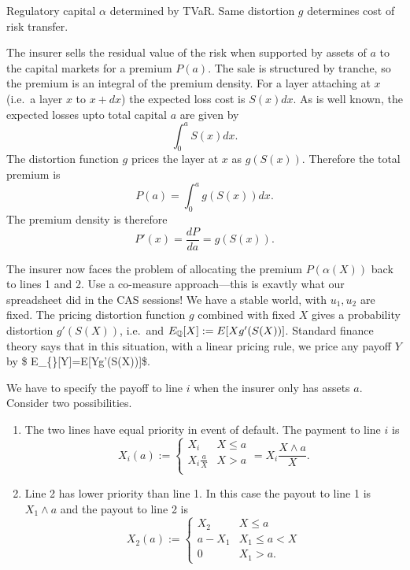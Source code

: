 Regulatory capital \(\alpha\) determined by TVaR. Same distortion \(g\)
determines cost of risk transfer.

The insurer sells the residual value of the risk when supported by
assets of \(a\) to the capital markets for a premium \(P(a)\). The sale
is structured by tranche, so the premium is an integral of the premium
density. For a layer attaching at \(x\) (i.e.~a layer \(x\) to \(x+dx\))
the expected loss cost is \(S(x)dx\). As is well known, the expected
losses upto total capital \(a\) are given by \[
\int_0^a S(x)dx.
\] The distortion function \(g\) prices the layer at \(x\) as
\(g(S(x))\). Therefore the total premium is \[
P(a) = \int_0^a g(S(x))dx.
\] The premium density is therefore \[
P'(x) = \frac{dP}{da} = g(S(x)).
\]

The insurer now faces the problem of allocating the premium
\(P(\alpha(X))\) back to lines 1 and 2. Use a co-measure approach---this
is exavtly what our spreadsheet did in the CAS sessions! We have a
stable world, with \(u_1,u_2\) are fixed. The pricing distortion
function \(g\) combined with fixed \(X\) gives a probability distortion
\(g'(S(X))\), i.e.~and \(E_{\Bbb{Q}}[X] := E[Xg'(S(X))]\). Standard
finance theory says that in this situation, with a linear pricing rule,
we price any payoff \(Y\) by \$
E\_\{\}{[}Y{]}=E{[}Yg'(S(X)){]}\$.

We have to specify the payoff to line \(i\) when the insurer only has
assets \(a\). Consider two possibilities.

\begin{enumerate}
\def\labelenumi{\arabic{enumi}.}
\tightlist
\item
  The two lines have equal priority in event of default. The payment to
  line \(i\) is \[
  X_i(a):=
  \begin{cases}
  X_i & X \le a \\
  X_i\frac{a}{X} & X > a \\
  \end{cases}
  = X_i \frac{X\wedge a}{X}.
  \]
\item
  Line 2 has lower priority than line 1. In this case the payout to line
  1 is \(X_1\wedge a\) and the payout to line 2 is \[
  X_2(a):=
  \begin{cases}
  X_2    & X \le a \\
  a-X_1  & X_1 \le a < X  \\
  0      & X_1 > a.
  \end{cases}
  \]
\end{enumerate}

